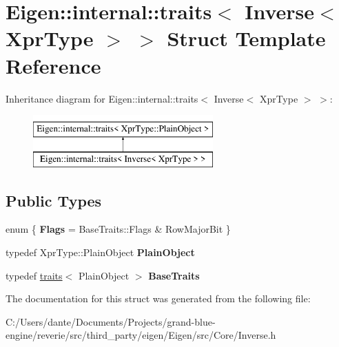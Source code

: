 \hypertarget{struct_eigen_1_1internal_1_1traits_3_01_inverse_3_01_xpr_type_01_4_01_4}{}\section{Eigen\+::internal\+::traits$<$ Inverse$<$ Xpr\+Type $>$ $>$ Struct Template Reference}
\label{struct_eigen_1_1internal_1_1traits_3_01_inverse_3_01_xpr_type_01_4_01_4}
Inheritance diagram for Eigen\+::internal\+::traits$<$ Inverse$<$ Xpr\+Type $>$ $>$\+:\begin{figure}[H]
\begin{center}
\leavevmode
\includegraphics[height=2.000000cm]{struct_eigen_1_1internal_1_1traits_3_01_inverse_3_01_xpr_type_01_4_01_4}
\end{center}
\end{figure}
\subsection*{Public Types}
\begin{DoxyCompactItemize}
\item 
\mbox{\label{struct_eigen_1_1internal_1_1traits_3_01_inverse_3_01_xpr_type_01_4_01_4_a4bf43108be29e122e366849c98a3cacd}} 
enum \{ {\bfseries Flags} = Base\+Traits\+::Flags \& Row\+Major\+Bit
 \}
\item 
\mbox{\label{struct_eigen_1_1internal_1_1traits_3_01_inverse_3_01_xpr_type_01_4_01_4_a22fef0ddc69b1cfcd4eab507ec9101f9}} 
typedef Xpr\+Type\+::\+Plain\+Object {\bfseries Plain\+Object}
\item 
\mbox{\label{struct_eigen_1_1internal_1_1traits_3_01_inverse_3_01_xpr_type_01_4_01_4_a48deb526f9cf30c706ae8d9d478ced38}} 
typedef \mbox{\hyperlink{struct_eigen_1_1internal_1_1traits}{traits}}$<$ Plain\+Object $>$ {\bfseries Base\+Traits}
\end{DoxyCompactItemize}


The documentation for this struct was generated from the following file\+:\begin{DoxyCompactItemize}
\item 
C\+:/\+Users/dante/\+Documents/\+Projects/grand-\/blue-\/engine/reverie/src/third\+\_\+party/eigen/\+Eigen/src/\+Core/Inverse.\+h\end{DoxyCompactItemize}
